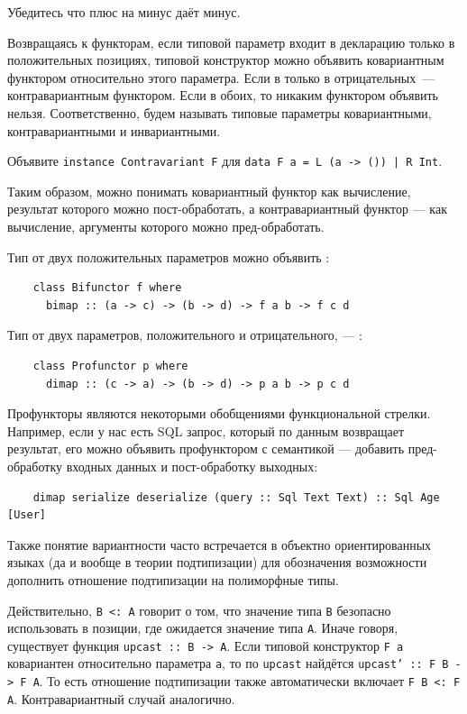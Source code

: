 \begin{task}
    Убедитесь что плюс на минус даёт минус.
\end{task}

Возвращаясь к функторам, если типовой параметр входит в декларацию только в положительных позициях, типовой конструктор можно объявить ковариантным функтором относительно этого параметра.
Если в только в отрицательных~--- контравариантным функтором.
Если в обоих, то никаким функтором объявить нельзя.
Соответственно, будем называть типовые параметры ковариантными, контравариантными и инвариантными.

\begin{task}
    Объявите \texttt{instance Contravariant F} для \texttt{data F a = L (a -> ()) | R Int}.
\end{task}

Таким образом, можно понимать ковариантный функтор как вычисление, результат которого можно пост-обработать, а контравариантный функтор --- как вычисление, аргументы которого можно пред-обработать.

Тип от двух положительных параметров можно объявить :
\begin{verbatim}
    class Bifunctor f where
      bimap :: (a -> c) -> (b -> d) -> f a b -> f c d
\end{verbatim}

Тип от двух параметров, положительного и отрицательного, --- :
\begin{verbatim}
    class Profunctor p where
      dimap :: (c -> a) -> (b -> d) -> p a b -> p c d
\end{verbatim}

Профункторы являются некоторыми обобщениями функциональной стрелки.
Например, если у нас есть SQL запрос, который по данным возвращает результат, его можно объявить профунктором с семантикой --- добавить пред-обработку входных данных и пост-обработку выходных:
\begin{verbatim}
    dimap serialize deserialize (query :: Sql Text Text) :: Sql Age [User]
\end{verbatim}

Также понятие вариантности часто встречается в объектно ориентированных языках (да и вообще в теории подтипизации) для обозначения возможности дополнить отношение подтипизации на полиморфные типы.

Действительно,  \texttt{B <: A} говорит о том, что значение типа \texttt{B} безопасно использовать в позиции, где ожидается значение типа \texttt{A}.
Иначе говоря, существует функция \texttt{upcast :: B -> A}.
Если типовой конструктор \texttt{F a} ковариантен относительно параметра \texttt{a}, то по \texttt{upcast} найдётся \texttt{upcast' :: F B -> F A}.
То есть отношение подтипизации также автоматически включает \texttt{F B <: F A}.
Контравариантный случай аналогично.

